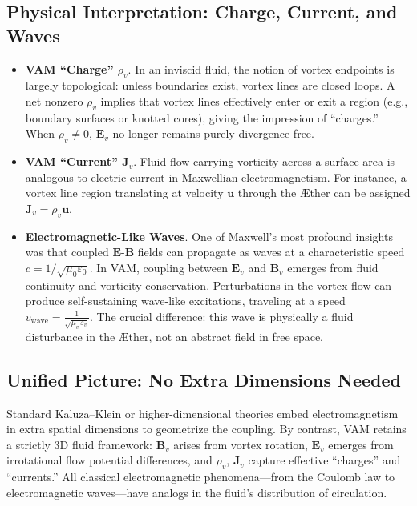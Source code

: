 \documentclass[aps,preprint,superscriptaddress]{revtex4-2}
\begin{document}
    \subsection{Physical Interpretation: Charge, Current, and Waves}

    \begin{itemize}
        \item \textbf{VAM “Charge” \(\rho_v\)}.  In an inviscid fluid, the notion of vortex endpoints is largely topological: unless boundaries exist, vortex lines are closed loops. A net nonzero \(\rho_v\) implies that vortex lines effectively enter or exit a region (e.g., boundary surfaces or knotted cores), giving the impression of “charges.” When \(\rho_v\neq 0\), \(\mathbf{E}_v\) no longer remains purely divergence-free.

        \item \textbf{VAM “Current” \(\mathbf{J}_v\)}.  Fluid flow carrying vorticity across a surface area is analogous to electric current in Maxwellian electromagnetism. For instance, a vortex line region translating at velocity \(\mathbf{u}\) through the Æther can be assigned \(\mathbf{J}_v = \rho_v \mathbf{u}\).

        \item \textbf{Electromagnetic-Like Waves}.  One of Maxwell’s most profound insights was that coupled \(\mathbf{E}\)-\(\mathbf{B}\) fields can propagate as waves at a characteristic speed \(c = 1/\sqrt{\mu_0\varepsilon_0}\). In VAM, coupling between \(\mathbf{E}_v\) and \(\mathbf{B}_v\) emerges from fluid continuity and vorticity conservation. Perturbations in the vortex flow can produce self-sustaining wave-like excitations, traveling at a speed \(\displaystyle v_{\mathrm{wave}} = \frac{1}{\sqrt{\mu_v\,\varepsilon_v}}\). The crucial difference: this wave is physically a fluid disturbance in the Æther, not an abstract field in free space.
    \end{itemize}

    \subsection{Unified Picture: No Extra Dimensions Needed}

    Standard Kaluza–Klein or higher-dimensional theories embed electromagnetism in extra spatial dimensions to geometrize the coupling. By contrast, VAM retains a strictly 3D fluid framework: \(\mathbf{B}_v\) arises from vortex rotation, \(\mathbf{E}_v\) emerges from irrotational flow potential differences, and \(\rho_v\), \(\mathbf{J}_v\) capture effective “charges” and “currents.” All classical electromagnetic phenomena—from the Coulomb law to electromagnetic waves—have analogs in the fluid’s distribution of circulation.
\end{document}
